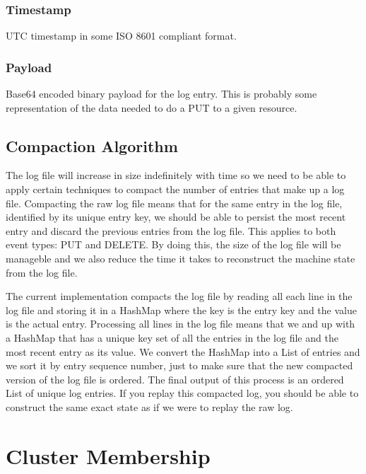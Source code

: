 \documentclass[11pt]{article}
\begin{document}
\subsubsection{Timestamp}
UTC timestamp in some ISO 8601 compliant format.

\subsubsection{Payload}
Base64 encoded binary payload for the log entry.  This is probably some representation of the data needed to do a PUT to a given resource.


\subsection{Compaction Algorithm}

The log file will increase in size indefinitely with time so we  need to be able to apply certain techniques to compact the number of entries that make up a log file. Compacting the raw log file means that for the same entry in the log file, identified by its unique entry key, we should be able to persist the most recent entry and discard the previous entries from the log file. This applies to both event types: PUT and DELETE. By doing this, the size of the log file will be manageble and we also reduce the time it takes to reconstruct the machine state from the log file.

The current implementation compacts the log file by reading all each line in the log file and storing it in a HashMap where the key is the entry key and the value is the actual entry. Processing all lines in the log file means that we and up with a HashMap that has a unique key set of all the entries in the log file and the most recent entry as its value. We convert the HashMap into a List of entries and we sort it by entry sequence number, just to make sure that the new compacted version of the log file is ordered. The final output of this process is an ordered List of unique log entries. If you replay this compacted log, you should be able to construct the same exact state as if we were to replay the raw log.

\section{Cluster Membership}
\end{document}
